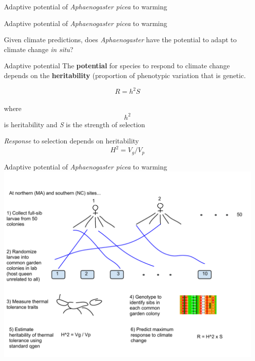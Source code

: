 \documentclass{beamer}
\begin{document}
\begin{frame}{Adaptive potential of \textit{Aphaenogaster picea} to warming}

\end{frame}

\begin{frame}{Adaptive potential of \textit{Aphaenogaster picea} to warming}

	Given climate predictions, does \textit{Aphaenogaster} have the potential to adapt to climate change \emph{in situ}?	

	\begin{block}{Adaptive potential}
		The \textbf{potential} for species to respond to climate change depends on the \textbf{heritability} (proportion of phenotypic variation that is genetic. 

		$$R = h^2 S$$ \\

		where $$ h ^ 2 $$ is heritability and \textit{S} is the strength of selection 

		\textit{Response} to selection depends on heritability \\

	        $$ H^2 = V_g/V_p $$

	\end{block}
\end{frame}


\begin{frame}{Adaptive potential of \textit{Aphaenogaster picea} to warming}
	\includegraphics[width=\textwidth, height=\textheight, keepaspectratio]{adaptive_potential_diagram.pdf}
\end{frame}{}
\end{document}
